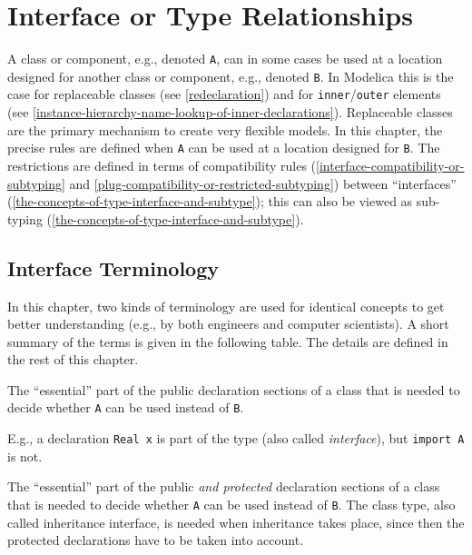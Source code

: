 \chapter{Interface or Type Relationships}\label{interface-or-type-relationships}

A class or component, e.g., denoted \lstinline!A!, can in some cases be used at a location designed for another class or component, e.g., denoted \lstinline!B!.
In Modelica this is the case for replaceable classes (see \cref{redeclaration}) and for \lstinline!inner!/\lstinline!outer! elements (see \cref{instance-hierarchy-name-lookup-of-inner-declarations}).
Replaceable classes are the primary mechanism to create very flexible models.
In this chapter, the precise rules are defined when \lstinline!A! can be used at a location designed for \lstinline!B!.
The restrictions are defined in terms of compatibility rules (\cref{interface-compatibility-or-subtyping} and \cref{plug-compatibility-or-restricted-subtyping}) between ``interfaces'' (\cref{the-concepts-of-type-interface-and-subtype}); this can also be viewed as sub-typing (\cref{the-concepts-of-type-interface-and-subtype}).

\section{Interface Terminology}\label{interface-terminology}

In this chapter, two kinds of terminology are used for identical concepts to get better understanding (e.g., by both engineers and computer scientists).
A short summary of the terms is given in the following table.
The details are defined in the rest of this chapter.

\begin{definition}
The ``essential'' part of the public declaration sections of a class that is needed to decide whether \lstinline!A! can be used instead of \lstinline!B!.
\par
\begin{nonnormative*}
E.g., a declaration \lstinline!Real x! is part of the type (also called \emph{interface}), but \lstinline!import A! is not.
\end{nonnormative*}
\end{definition}

\begin{definition}
The ``essential'' part of the public \emph{and protected} declaration sections of a class that is needed to decide whether \lstinline!A! can be used instead of \lstinline!B!.
The class type, also called inheritance interface, is needed when inheritance takes place, since then the protected declarations have to be taken into account.
\end{definition}


